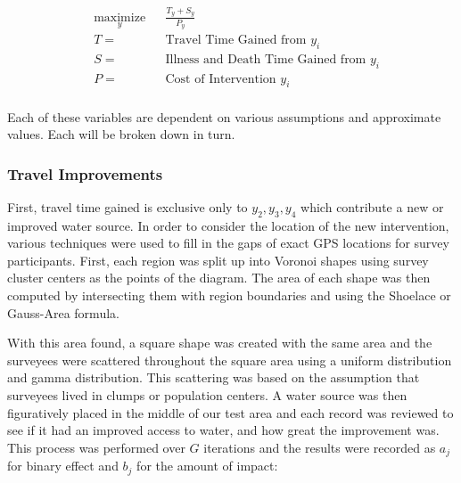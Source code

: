 \begin{center}
\begin{equation}
\begin{aligned}
& \underset{y}{\text{maximize}}
& & \frac{T_y + S_y}{P_y}  \\
& T =
& & \text{Travel Time Gained from } y_i \\
& S =
& & \text{Illness and Death Time Gained from } y_i \\
& P =
& & \text{Cost of Intervention } y_i \\
\end{aligned}
\end{equation}
\end{center}

Each of these variables are dependent on various assumptions and approximate values.
Each will be broken down in turn.

\subsubsection*{Travel Improvements}
First, travel time gained is exclusive only to $y_2,y_3,y_4$ which contribute a new or improved water source.
In order to consider the location of the new intervention, various techniques were used to fill in the gaps of exact GPS locations for survey participants.
First, each region was split up into Voronoi shapes using survey cluster centers as the points of the diagram. %
The area of each shape was then computed by intersecting them with region boundaries and using the Shoelace or Gauss-Area formula. %

With this area found, a square shape was created with the same area and the surveyees were scattered throughout the square area using a uniform distribution and gamma distribution.
This scattering was based on the assumption that surveyees lived in clumps or population centers.
A water source was then figuratively placed in the middle of our test area and each record was reviewed to see if it had an improved access to water, and how great the improvement was.
This process was performed over $G$ iterations and the results were recorded as $a_j$ for binary effect and $b_j$ for the amount of impact:

